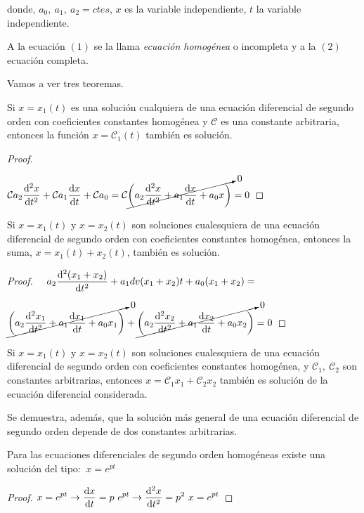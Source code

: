 {donde, $a_0,\ a_1,\ a_2=ctes$, $x$ es la variable independiente, $t$ la variable independiente.

A la ecuación $(1)$ se la llama \emph{ecuación homogénea} o incompleta y a la $(2)$ ecuación completa.

Vamos a ver tres teoremas.

\begin{teor}
Si $x=x_1(t)$ es una solución cualquiera de una 	ecuación diferencial de segundo orden con coeficientes constantes homogénea y $\mathcal C$ es una constante arbitraria, \textsf{entonces} la función $x=\mathcal C _1(t)$ también es solución.
\end{teor}
\begin{proof}\textcolor{white}{.}

$\displaystyle \mathcal C a_2 \dv[2]{x}{t}+\mathcal Ca_1 \dv{x}{t}+\mathcal C a_0=\mathcal C \cancelto{0}{ \left( a_2  \dv[2]{x}{t}+a_1 \dv{x}{t}+a_0 x \right) } = 0 $	
\end{proof}

\begin{teor}
	Si $x=x_1(t)$ y $x=x_2(t)$ son soluciones cualesquiera de una 	ecuación diferencial de segundo orden con coeficientes constantes homogénea, \textsf{entonces} la suma, $x=x_1(t)+x_2(t)$, también es solución.
\end{teor}
\begin{proof}
	$\displaystyle  \quad 
	a_2 \dv[2]{(x_1+x_2)}{t}+a_1 dv{(x_1+x_2)}{t}+a_0(x_1+x_2) = $
	
	$\displaystyle 
	\cancelto{0}{\left( a_2 \dv[2]{x_1}{t}+a_1\dv{x_1}{t}+a_0 x_1 \right)} +
		\cancelto{0}{\left( a_2 \dv[2]{x_2}{t}+a_1\dv{x_2}{t}+a_0 x_2 \right)} =0$
\end{proof}

\begin{coro}
	Si $x=x_1(t)$ y $x=x_2(t)$ son soluciones cualesquiera de una 	ecuación diferencial de segundo orden con coeficientes constantes homogénea, y $\mathcal C_1,\ \mathcal C_2$ son constantes arbitrarias, \textsf{entonces} $x=\mathcal C_1 x_1+ \mathcal C_2 x_2$ también es solución de la ecuación diferencial considerada.
\end{coro}

Se demuestra, además, que la solución más general de una ecuación diferencial de segundo orden depende de dos constantes arbitrarias.

\begin{coro}
	Para las ecuaciones diferenciales de segundo orden homogéneas existe una solución del tipo: $\ x=e^{pt}$
\end{coro}
\begin{proof}
 $\displaystyle x=e^{pt} \to \dv{x}{t}=p \ e^{pt} \to \dv[2]{x}{t}=p^2 \ x=e^{pt}$	
 

\end{proof}}
